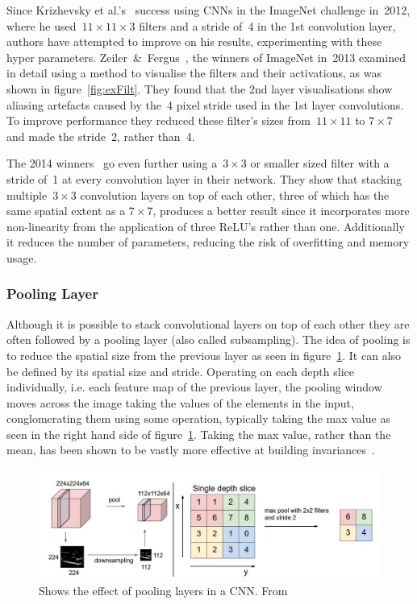 \documentclass[11pt]{article} %
\begin{document}
Since Krizhevsky et al.'s~\cite{Krizhevsky2012} success using CNNs in the ImageNet challenge in~2012, where he used~$11\times 11 \times 3 $ filters and a stride of~4 in the 1st convolution layer, authors have attempted to improve on his results, experimenting with these hyper parameters. Zeiler~\&~Fergus~\cite{Zeiler2014}, the winners of ImageNet in~2013 examined~\cite{Krizhevsky2012} in detail using a method to visualise the filters and their activations, as was shown in figure~\ref{fig:exFilt}. They found that the 2nd layer visualisations show aliasing artefacts caused by the~4 pixel stride used in the 1st layer convolutions. To improve performance they reduced these filter's sizes from~$11\times 11$ to $7\times 7$ and made the stride~2, rather than~4. 

The 2014 winners~\cite{Simonyan2015} go even further using a~$3\times 3$ or smaller sized filter with a stride of~1 at every convolution layer in their network. They show that stacking multiple~$3\times 3$ convolution layers on top of each other, three of which has the same spatial extent as a $7\times 7$, produces a better result since it incorporates more non-linearity from the application of three ReLU's rather than one. Additionally it reduces the number of parameters, reducing the risk of overfitting and memory usage. 

\subsubsection{Pooling Layer}

Although it is possible to stack convolutional layers on top of each other they are often followed by a pooling layer (also called subsampling). The idea of pooling is to reduce the spatial size from the previous layer as seen in figure~\ref{fig:pool}. It can also be defined by its spatial size and stride. Operating on each depth slice individually, i.e. each feature map of the previous layer, the pooling window moves across the image taking the values of the elements in the input, conglomerating them using some operation, typically taking the max value as seen in the right hand side of figure~\ref{fig:pool}. Taking the max value, rather than the mean, has been shown to be vastly more effective at building invariances~\cite{Scherer2010}.
\begin{figure}
\includegraphics*[width=1\linewidth,clip]{pooling}
\caption{Shows the effect of pooling layers in a CNN.  From~\cite{KarLects} \label{fig:pool}  } 
\end{figure}
\end{document}
